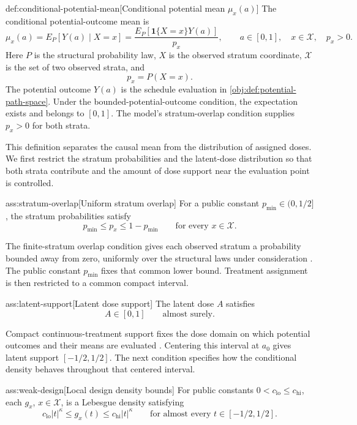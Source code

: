 \begin{definitionv}{def:conditional-potential-mean}[Conditional potential mean \(\mu_x(a)\)]
The conditional potential-outcome mean is
\[
\mu_x(a)
=
E_P[Y(a)\mid X=x]
=
\frac{E_P[\mathbf1\{X=x\}Y(a)]}{p_x},
\qquad a\in[0,1],\quad x\in\mathcal X,\quad p_x>0.
\]
Here \(P\) is the structural probability law, \(X\) is the observed stratum coordinate, \(\mathcal X\) is the set of two observed strata, and
\[
p_x=P(X=x).
\]
The potential outcome \(Y(a)\) is the schedule evaluation in \cref{obj:def:potential-path-space}. Under the bounded-potential-outcome condition, the expectation exists and belongs to \([0,1]\). The model's stratum-overlap condition supplies \(p_x>0\) for both strata.
\end{definitionv}

This definition separates the causal mean from the distribution of assigned doses. We first restrict the stratum probabilities and the latent-dose distribution so that both strata contribute and the amount of dose support near the evaluation point is controlled.

\begin{assumptionv}{ass:stratum-overlap}[Uniform stratum overlap]
For a public constant \(p_{\min}\in(0,1/2]\), the stratum probabilities satisfy
\[
p_{\min}\le p_x\le 1-p_{\min}
\qquad\text{for every }x\in\mathcal X.
\]
\end{assumptionv}

The finite-stratum overlap condition gives each observed stratum a probability bounded away from zero, uniformly over the structural laws under consideration \citep{HuangZhang2023}. The public constant \(p_{\min}\) fixes that common lower bound. Treatment assignment is then restricted to a common compact interval.

\begin{assumptionv}{ass:latent-support}[Latent dose support]
The latent dose \(A\) satisfies
\[
A\in[0,1]\qquad\text{almost surely}.
\]
\end{assumptionv}

Compact continuous-treatment support fixes the dose domain on which potential outcomes and their means are evaluated \citep{HuangZhang2023}. Centering this interval at \(a_0\) gives latent support \([-1/2,1/2]\). The next condition specifies how the conditional density behaves throughout that centered interval.

\begin{assumptionv}{ass:weak-design}[Local design density bounds]
For public constants \(0<c_{\mathrm{lo}}\le c_{\mathrm{hi}}\), each \(g_x\), \(x\in\mathcal X\), is a Lebesgue density satisfying
\[
c_{\mathrm{lo}}|t|^\kappa
\le g_x(t)\le
c_{\mathrm{hi}}|t|^\kappa
\qquad\text{for almost every }t\in[-1/2,1/2].
\]
\end{assumptionv}

